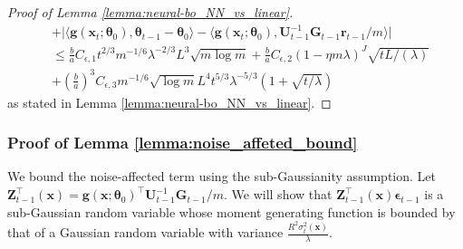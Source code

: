 \begin{proof}[Proof of Lemma \ref{lemma:neural-bo_NN_vs_linear}]
\begin{align*}
        &  + \lvert \langle\mathbf{g}(\mathbf{x}_{t};\boldsymbol{\theta}_{0}),\boldsymbol{\theta}_{t-1}-\boldsymbol{\theta}_{0}\rangle-\langle\mathbf{g}(\mathbf{x}_{t};\boldsymbol{\theta}_{0}),\mathbf{U}_{t-1}^{-1}\mathbf{G}_{t-1}\mathbf{r}_{t-1}/m\rangle \rvert \\
        & \leq \frac{b}{a} C_{\epsilon,1}   t^{2/3}m^{-1/6}\lambda^{-2/3} L^{3}\sqrt{m\log m} + \frac{b}{a} C_{\epsilon,2} (1-\eta m\lambda)^{J} \sqrt{tL/(\lambda)} \\  
        & +\left(\frac{b}{a} \right)^3 C_{\epsilon,3} m^{-1/6} \sqrt{\log m} L^4 t^{5/3} \lambda ^{-5/3} \left(1 + \sqrt{t/\lambda} \right)  
\end{align*} 
as stated in Lemma \ref{lemma:neural-bo_NN_vs_linear}.
\end{proof}

\subsubsection{Proof of Lemma \ref{lemma:noise_affeted_bound}}
\label{noise_affeted_bound_proof}
    
We bound the noise-affected term using the sub-Gaussianity assumption. Let $\mathbf{Z}_{t-1}^\top(\mathbf{x})  = \mathbf{g}(\mathbf{x}; \boldsymbol{\theta}_0)^\top \mathbf{U}^{-1}_{t-1} \mathbf{G}_{t-1} /m$. We will show that $\mathbf{Z}_{t-1}^\top(\mathbf{x}) \boldsymbol{\epsilon}_{t-1}$ is a sub-Gaussian random variable whose moment generating function is bounded by that
of a Gaussian random variable with variance $\frac{R^2\sigma_{t}^2(\mathbf{x})}{\lambda}$.

